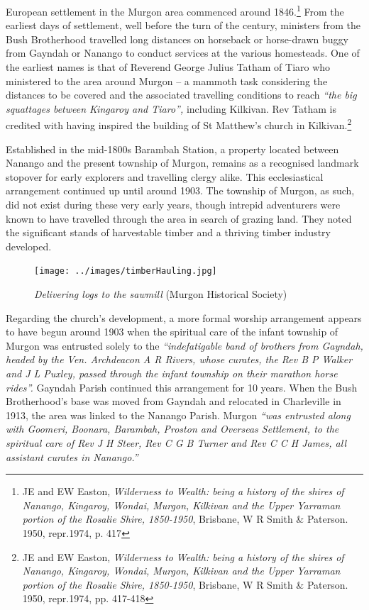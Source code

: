 European settlement in the Murgon area commenced around 1846.\footnote{JE and EW Easton, \emph{Wilderness to Wealth: being a history of the shires of Nanango, Kingaroy, Wondai, Murgon, Kilkivan and the Upper Yarraman portion of the Rosalie Shire, 1850-1950}, Brisbane, W R Smith \& Paterson. 1950, repr.1974, p. 417} From the earliest days of settlement, well before the turn of the century, ministers from the Bush Brotherhood travelled long distances on horseback or horse-drawn buggy from Gayndah or Nanango to conduct services at the various homesteads. One of the earliest names is that of Reverend George Julius Tatham of Tiaro who ministered to the area around Murgon -- a mammoth task considering the distances to be covered and the associated travelling conditions to reach \emph{``the big squattages between Kingaroy and Tiaro'',} including Kilkivan. Rev Tatham is credited with having inspired the building of St Matthew's church in Kilkivan.\footnote{JE and EW Easton, \emph{Wilderness to Wealth: being a history of the shires of Nanango, Kingaroy, Wondai, Murgon, Kilkivan and the Upper Yarraman portion of the Rosalie Shire, 1850-1950}, Brisbane, W R Smith \& Paterson. 1950, repr.1974, pp. 417-418}


Established in the mid-1800s Barambah Station, a property located between Nanango and the present township of Murgon, remains as a recognised landmark stopover for early explorers and travelling clergy alike. This ecclesiastical arrangement continued up until around 1903. The township of Murgon, as such, did not exist during these very early years, though intrepid adventurers were known to have travelled through the area in search of grazing land. They noted the significant stands of harvestable timber and a thriving timber industry developed.









\begin{figure}
\begin{center}
\texttt{[image: ../images/timberHauling.jpg]}
\caption{{\itshape Delivering logs to the sawmill} {\scriptsize(Murgon Historical Society)}}
\end{center}
\end{figure}




Regarding the church's development, a more formal worship arrangement appears to have begun around 1903 when the spiritual care of the infant township of Murgon was entrusted solely to the \emph{``indefatigable band of brothers from Gayndah, headed by the Ven. Archdeacon A R Rivers, whose curates, the Rev B P Walker and J L Puxley, passed through the infant township on their marathon horse rides''.} Gayndah Parish continued this arrangement for 10 years. When the Bush Brotherhood's base was moved from Gayndah and relocated in Charleville in 1913, the area was linked to the Nanango Parish. Murgon \emph{``was entrusted along with Goomeri, Boonara, Barambah, Proston and Overseas Settlement, to the spiritual care of Rev J H Steer, Rev C G B Turner and Rev C C H James, all assistant curates in Nanango.''}



